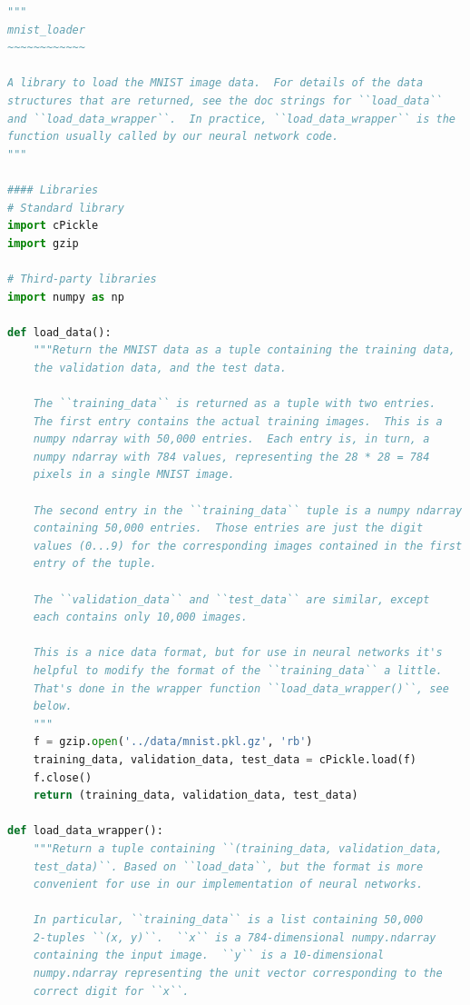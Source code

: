 \begin{lstlisting}[language=Python]
"""
mnist_loader
~~~~~~~~~~~~

A library to load the MNIST image data.  For details of the data
structures that are returned, see the doc strings for ``load_data``
and ``load_data_wrapper``.  In practice, ``load_data_wrapper`` is the
function usually called by our neural network code.
"""

#### Libraries
# Standard library
import cPickle
import gzip

# Third-party libraries
import numpy as np

def load_data():
    """Return the MNIST data as a tuple containing the training data,
    the validation data, and the test data.

    The ``training_data`` is returned as a tuple with two entries.
    The first entry contains the actual training images.  This is a
    numpy ndarray with 50,000 entries.  Each entry is, in turn, a
    numpy ndarray with 784 values, representing the 28 * 28 = 784
    pixels in a single MNIST image.

    The second entry in the ``training_data`` tuple is a numpy ndarray
    containing 50,000 entries.  Those entries are just the digit
    values (0...9) for the corresponding images contained in the first
    entry of the tuple.

    The ``validation_data`` and ``test_data`` are similar, except
    each contains only 10,000 images.

    This is a nice data format, but for use in neural networks it's
    helpful to modify the format of the ``training_data`` a little.
    That's done in the wrapper function ``load_data_wrapper()``, see
    below.
    """
    f = gzip.open('../data/mnist.pkl.gz', 'rb')
    training_data, validation_data, test_data = cPickle.load(f)
    f.close()
    return (training_data, validation_data, test_data)

def load_data_wrapper():
    """Return a tuple containing ``(training_data, validation_data,
    test_data)``. Based on ``load_data``, but the format is more
    convenient for use in our implementation of neural networks.

    In particular, ``training_data`` is a list containing 50,000
    2-tuples ``(x, y)``.  ``x`` is a 784-dimensional numpy.ndarray
    containing the input image.  ``y`` is a 10-dimensional
    numpy.ndarray representing the unit vector corresponding to the
    correct digit for ``x``.


\end{lstlisting}
